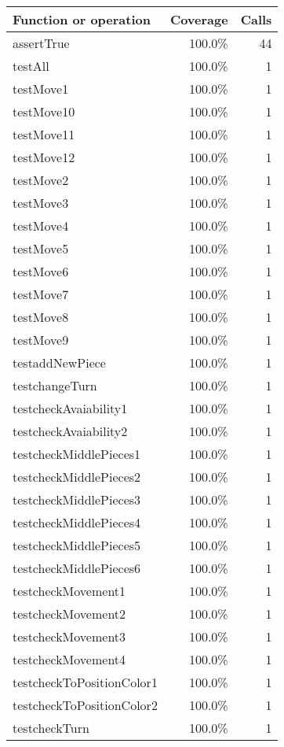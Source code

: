 \begin{longtable}{|l|r|r|}
\hline
Function or operation & Coverage & Calls \\
\hline
\hline
assertTrue & 100.0\% & 44 \\
\hline
testAll & 100.0\% & 1 \\
\hline
testMove1 & 100.0\% & 1 \\
\hline
testMove10 & 100.0\% & 1 \\
\hline
testMove11 & 100.0\% & 1 \\
\hline
testMove12 & 100.0\% & 1 \\
\hline
testMove2 & 100.0\% & 1 \\
\hline
testMove3 & 100.0\% & 1 \\
\hline
testMove4 & 100.0\% & 1 \\
\hline
testMove5 & 100.0\% & 1 \\
\hline
testMove6 & 100.0\% & 1 \\
\hline
testMove7 & 100.0\% & 1 \\
\hline
testMove8 & 100.0\% & 1 \\
\hline
testMove9 & 100.0\% & 1 \\
\hline
testaddNewPiece & 100.0\% & 1 \\
\hline
testchangeTurn & 100.0\% & 1 \\
\hline
testcheckAvaiability1 & 100.0\% & 1 \\
\hline
testcheckAvaiability2 & 100.0\% & 1 \\
\hline
testcheckMiddlePieces1 & 100.0\% & 1 \\
\hline
testcheckMiddlePieces2 & 100.0\% & 1 \\
\hline
testcheckMiddlePieces3 & 100.0\% & 1 \\
\hline
testcheckMiddlePieces4 & 100.0\% & 1 \\
\hline
testcheckMiddlePieces5 & 100.0\% & 1 \\
\hline
testcheckMiddlePieces6 & 100.0\% & 1 \\
\hline
testcheckMovement1 & 100.0\% & 1 \\
\hline
testcheckMovement2 & 100.0\% & 1 \\
\hline
testcheckMovement3 & 100.0\% & 1 \\
\hline
testcheckMovement4 & 100.0\% & 1 \\
\hline
testcheckToPositionColor1 & 100.0\% & 1 \\
\hline
testcheckToPositionColor2 & 100.0\% & 1 \\
\hline
testcheckTurn & 100.0\% & 1 \\

\end{longtable}
